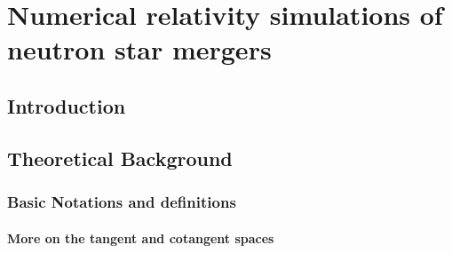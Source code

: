 \part{Numerical relativity simulations of neutron star mergers}




\chapter{Introduction}



\chapter{Theoretical Background} %


\section{Basic Notations and definitions}

\subsection{More on the tangent and cotangent spaces}

